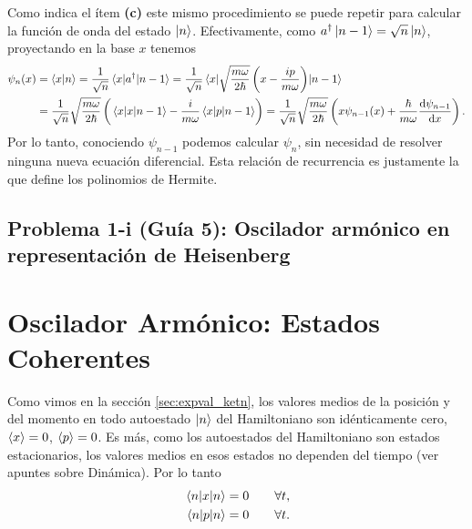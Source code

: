 \documentclass[10pt, a4paper]{article}
\newcommand{\aprefactsq}{\frac{m\omega}{2\hbar}}
\newcommand{\aprefact}{\sqrt{\aprefactsq}}
\numberwithin{equation}{subsection}
\begin{document}
\bigbreak

Como indica el ítem \textbf{(c)} este mismo procedimiento se puede repetir para
calcular la función de onda del estado $\ket{n}$. Efectivamente, como
$a^\dagger\ket{n-1} = \sqrt{n}\ket{n}$, proyectando en la base $x$ tenemos
\begin{align}
  \psi_{n}(x) &= \braket{x}{n} = \frac{1}{\sqrt{n}}
    \matrixel{x}{a^\dagger}{n-1} = \frac{1}{\sqrt{n}}
    \matrixel{x}{\aprefact\left(x - \frac{ip}{m\omega}\right)}{n-1} \nonumber
    \\
  &= \frac{1}{\sqrt{n}}\aprefact\left(\matrixel{x}{x}{n-1} -
    \frac{i}{m\omega}\matrixel{x}{p}{n-1}\right) = \frac{1}{\sqrt{n}}
    \aprefact\left(x\psi_{n-1}(x) +
    \frac{\hbar}{m\omega}\dv{\psi_{n-1}}{x}\right).
\end{align}
Por lo tanto, conociendo $\psi_{n-1}$ podemos calcular $\psi_{n}$, sin
necesidad de resolver ninguna nueva ecuación diferencial. Esta relación de
recurrencia es justamente la que define los polinomios de Hermite.

\subsection{Problema 1-i (Guía 5):
  Oscilador armónico en representación de Heisenberg}


\section{Oscilador Armónico: Estados Coherentes}

Como vimos en la sección \ref{sec:expval_ketn}, los valores medios de la
posición y del momento en todo autoestado $\ket{n}$ del Hamiltoniano son
idénticamente cero, $\expval{x} = 0$, $\expval{p} = 0$. Es más, como los
autoestados del Hamiltoniano son estados estacionarios, los valores medios en
esos estados no dependen del tiempo (ver apuntes sobre Dinámica). Por lo tanto
\begin{align}
  \expval{x}{n} &= 0 \qquad \forall t, \\
  \expval{p}{n} &= 0 \qquad \forall t.
\end{align}
\end{document}

